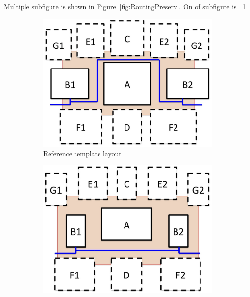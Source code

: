         Multiple subfigure is shown in Figure~\ref{fig:RoutingPreserv}. On of subfigure is ~\ref{fig:RoutingPreserv_A}

      \begin{figure}
        \centering
        \begin{subfigure}[t]{0.4\textwidth}
        \includegraphics[width=\textwidth]{Fig/Introduction/RoutingPreserv_a.eps}
        \caption{Reference template layout}
        \label{fig:RoutingPreserv_A}
        \end{subfigure}
        \begin{subfigure}[t]{0.4\textwidth}
        \includegraphics[width=\textwidth]{Fig/Introduction/RoutingPreserv_b.eps}

\end{subfigure}
\end{figure}
